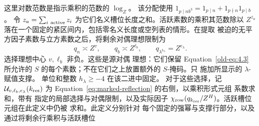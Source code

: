\documentclass[11pt,a4paper]{article}
\numberwithin{equation}{section}
\numberwithin{figure}{section}
\theoremstyle{definition}
\theoremstyle{remark}
\begin{document}
这里对数范数是指示乘积的范数的 \(\log_Z\)。
该分配使用
\(1_{p\mid nb^3}=1_{p\mid n}+1_{p\nmid n}1_{p\mid b}\)。
令 \(z_a=\sum_{i\ {\rm active}}z_i\) 为它们名义槽位长度之和。活跃素数的乘积其范数除以 \(Z^{z_a}\)
落在一个固定的紧区间内，包括零名义长度或空列表的情形。在提取
被迫的无平方因子素数与立方素数之后，将剩余对偶理想限制为
\[
 q_n\asymp Z^v,\qquad q_b\asymp Z^{\ell_b},\qquad
 q_{\lambda^{h_\lambda}}=Z^{e_\lambda}.
\]
选择理想中心 \(v,\ell_b\) 非负。这些是源对偶
理想：它们保留 Equation~\eqref{old-eq:4.3} 所允许的 \(S\) 的每个素数；不在它们之上放置额外的 \(S\)-掩码。只
施加所显示的 \(\lambda\)-赋值支撑。
单位和整数 \(h_\lambda\ge-4\) 在该二进中固定。
对于这些选择，记
\(\mathcal U_{v,\ell_b,e_\lambda}(k_{\rm res})\) 为
Equation~\eqref{eq:marked-reflection} 的右侧，以乘积形式元组
系数求和，带有
指定的局部选择与对偶限制，以及实际因子
\(\chi_{\rm row}(q_{k_{\rm res}}/Z^H)\)。活跃槽位元组在此定义中仍被
求和。此定义分别针对
每个固定的强幂与支撑行部分，以及通过将剩余行乘积与活跃槽位
\end{document}
